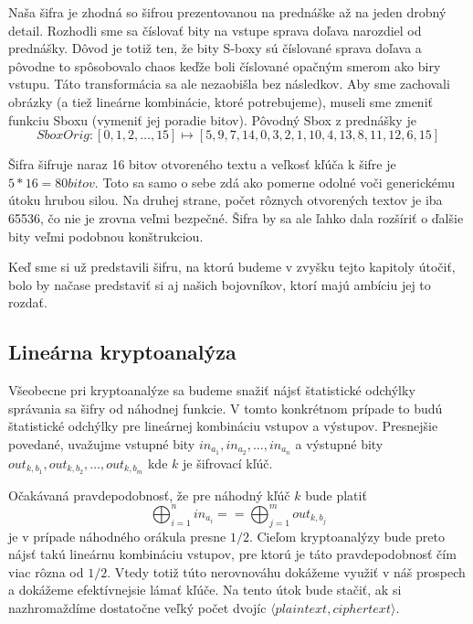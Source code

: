 \begin{poznamka}
    Naša šifra je zhodná so šifrou prezentovanou na prednáške až na
    jeden drobný detail. Rozhodli sme sa číslovať bity na vstupe
    sprava doľava narozdiel od prednášky. Dôvod je totiž ten, že bity
    S-boxy sú číslované sprava doľava a pôvodne to spôsobovalo chaos
    keďže boli číslované opačným smerom ako biry vstupu. Táto
    transformácia sa ale nezaobišla bez následkov. Aby sme zachovali
    obrázky (a tiež lineárne kombinácie, ktoré potrebujeme), museli
    sme zmeniť funkciu Sboxu (vymeniť jej poradie bitov).
    Pôvodný Sbox z prednášky je
    \begin{equation*}
    SboxOrig:[0,1,2,\dots,15] \mapsto
    [5, 9, 7, 14, 0, 3, 2, 1, 10, 4, 13, 8, 11, 12, 6, 15]
    \end{equation*}
\end{poznamka}

Šifra šifruje naraz 16 bitov otvoreného textu a 
veľkosť kľúča k šifre je $5*16=80\unit{bitov}$.
Toto sa samo o sebe zdá ako pomerne odolné voči generickému útoku
hrubou silou. Na druhej strane, počet rôznych otvorených textov je iba
65536, čo nie je zrovna veľmi bezpečné. Šifra by sa ale ľahko dala
rozšíriť o ďalšie bity veľmi podobnou konštrukciou.

Keď sme si už predstavili šifru, na ktorú budeme v zvyšku tejto
kapitoly útočiť, bolo by načase predstaviť si aj našich bojovníkov,
ktorí majú ambíciu jej to rozdať.

\subsection{Lineárna kryptoanalýza}

Všeobecne pri kryptoanalýze sa budeme snažiť nájsť štatistické odchýlky
správania sa šifry od náhodnej funkcie.
V tomto konkrétnom prípade to budú štatistické odchýlky
pre lineárnej kombináciu vstupov a výstupov.
Presnejšie povedané, uvažujme vstupné bity
$in_{a_1},in_{a_2},\dots,in_{a_n}$ a výstupné bity
$out_{k,b_1},out_{k,b_2},\dots,out_{k,b_m}$ kde $k$ je šifrovací kľúč.

Očakávaná pravdepodobnosť, že pre náhodný kľúč $k$ bude platiť
\begin{equation}
    \label{eq:lin_approx}
    \bigoplus_{i=1}^n in_{a_i} == \bigoplus_{j=1}^{m} out_{k,b_j}
\end{equation}
je v prípade náhodného orákula presne $1/2$. Cieľom kryptoanalýzy bude
preto nájsť takú lineárnu kombináciu vstupov, pre ktorú je táto
pravdepodobnosť čím viac rôzna od $1/2$. Vtedy totiž túto nerovnováhu
dokážeme využiť v náš prospech a dokážeme efektívnejsie lámať kľúče.
Na tento útok bude stačiť, ak si nazhromaždíme dostatočne veľký počet
dvojíc $\langle plaintext, ciphertext \rangle$.

